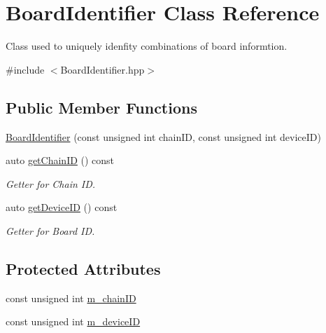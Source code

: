 \hypertarget{class_board_identifier}{}\section{Board\+Identifier Class Reference}
\label{class_board_identifier}


Class used to uniquely idenfity combinations of board informtion.  




{\ttfamily \#include $<$Board\+Identifier.\+hpp$>$}

\subsection*{Public Member Functions}
\begin{DoxyCompactItemize}
\item 
\hyperlink{class_board_identifier_abfdd1f7aada13dbe08113942b8c033a1}{Board\+Identifier} (const unsigned int chain\+ID, const unsigned int device\+ID)
\item 
auto \hyperlink{class_board_identifier_ad909f0c1eb9f80ec177ea8526c94d011}{get\+Chain\+ID} () const
\begin{DoxyCompactList}\small\item\em Getter for Chain ID. \end{DoxyCompactList}\item 
auto \hyperlink{class_board_identifier_a8f3d818c08107a42fe9305607be38a3b}{get\+Device\+ID} () const
\begin{DoxyCompactList}\small\item\em Getter for Board ID. \end{DoxyCompactList}\end{DoxyCompactItemize}
\subsection*{Protected Attributes}
\begin{DoxyCompactItemize}
\item 
const unsigned int \hyperlink{class_board_identifier_a53a9a7c31a0316eed7932615b04293ff}{m\+\_\+chain\+ID}
\item 
const unsigned int \hyperlink{class_board_identifier_ad7798603dc56380e884d075ba81495e1}{m\+\_\+device\+ID}
\end{DoxyCompactItemize}
